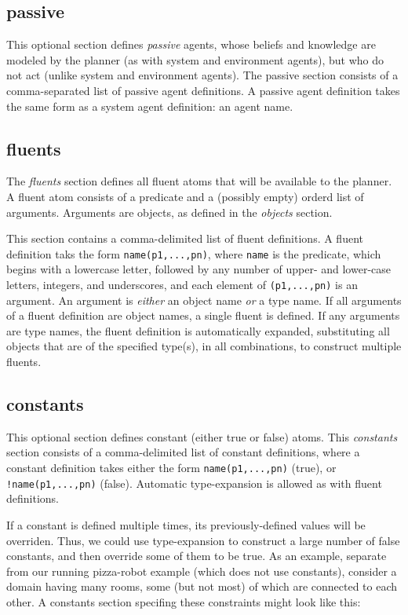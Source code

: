 \documentclass{article}
\begin{document}
\subsection{passive}

This optional section defines \emph{passive} agents, whose beliefs and knowledge are
modeled by the planner (as with system and environment agents), but
who do not act (unlike system and environment agents).
The passive section consists of a comma-separated list of passive agent
definitions. A passive agent definition takes the same form as a system
agent definition: an agent name.



\subsection{fluents}

The \emph{fluents} section defines all fluent atoms that will be available to the planner. A
fluent atom consists of a predicate and a (possibly empty) orderd list of
arguments. Arguments are objects, as defined in the \emph{objects} section.

This section contains a comma-delimited list of fluent definitions. A fluent
definition taks the form \verb|name(p1,...,pn)|, where \verb|name| is the
predicate, which begins with a lowercase letter, followed by any number of
upper- and lower-case letters, integers, and underscores, and each element of
\verb|(p1,...,pn)| is an argument. An argument is
\emph{either} an object name \emph{or} a type name. If all arguments
of a fluent definition are object names, a single fluent is defined. If any
arguments are type names, the fluent definition is automatically expanded,
substituting all objects that are of the specified type(s), in all combinations, to
construct multiple fluents.



\subsection{constants}

This optional section defines constant (either true or false) atoms. This
\emph{constants} section consists of a comma-delimited list of constant
definitions, where a constant definition takes either the form
\verb|name(p1,...,pn)| (true), 
or
\verb|!name(p1,...,pn)| (false).
Automatic type-expansion is allowed as with fluent definitions.

If a constant is defined multiple times, its previously-defined values will be
overriden. Thus, we could use type-expansion to construct
a large number of false constants, and then
override some of them to be true. As an example, separate from our
running pizza-robot example (which does not use constants), consider a domain
having many rooms, some (but not most) of which are connected to each other.
A constants section specifing these constraints might look like this:
\end{document}
